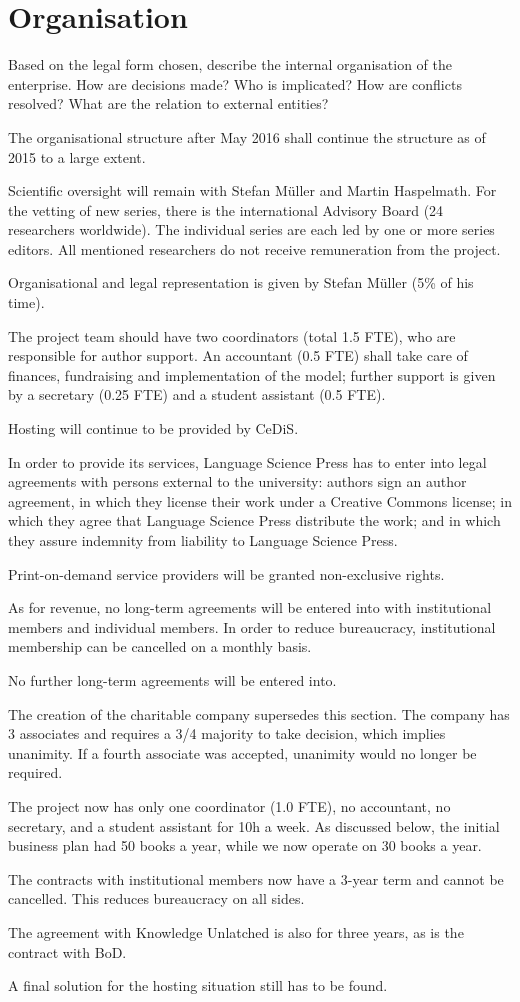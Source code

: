 \documentclass[nonflat,smallfont
]{langsci/langscibook}
\newcommand{\background}[1]{ 
  \vspace{5mm}
  \renewcommand{\tblslinecolour}{lsDarkBlue}
  \tblssy[red]{explore2}{Background}{\vspace*{-5mm}#1}
}
\newcommand{\langscisolution}[1]{
  \renewcommand{\tblslinecolour}{lsLightBlue}
  \tblssy{langsci}{LangSci solution}{\vspace*{-5mm}#1}
}
\newcommand{\evaluation}[1]{
  \renewcommand{\tblslinecolour}{lsLightOrange}
  \tblssy{receipt}{Evaluation}{\vspace*{-5mm}#1}
}
\renewcommand{\tblssy}[4][black!12]{%
  \renewcommand{\langscisymbol}{#2}\renewcommand{\tblsboxcolor}{#1}
  \begin{mdframed}[style=yellowexercise,frametitle={#3}]
    #4
  \end{mdframed}
}
\begin{document}
\section{Organisation}
\vspace*{5mm}
\background{Based on the legal form chosen, describe the internal organisation of the enterprise. How are decisions made? Who is implicated? How are conflicts resolved?
What are the relation to external entities?}
\langscisolution{

The organisational structure after May 2016 shall continue the structure as of 2015 to a large extent.

Scientific oversight will remain with Stefan Müller and Martin Haspelmath. For the vetting of new series, there is the international Advisory Board (24 researchers worldwide). The individual series are each led by one or more series editors. All mentioned researchers do not receive remuneration from the project. 

Organisational and legal representation is given by Stefan Müller (5\% of his time).

The project team should have two coordinators (total 1.5 FTE), who are responsible for author support. An accountant (0.5 FTE) shall take care of finances, fundraising and implementation of the model; further support is given by a secretary (0.25 FTE) and a student assistant (0.5 FTE). 

Hosting will continue to be provided by CeDiS.

In order to provide its services, Language Science Press has to enter into legal agreements with persons external to the university: authors sign an author agreement, in which they license their work under a Creative Commons license; in which they agree that Language Science Press distribute the work; and in which they assure indemnity from liability to Language Science Press.

Print-on-demand service providers will be granted non-ex\-clu\-sive rights. 

As for revenue, no long-term agreements will be entered into with institutional members and individual members. In order to reduce bureaucracy, institutional membership can be cancelled on a monthly basis. 

No further long-term agreements will be entered into. 
}
\evaluation{
The creation of the charitable company supersedes this section. The company has 3 associates and requires a 3/4 majority to take decision, which implies unanimity. If a fourth associate was accepted, unanimity would no longer be required.

The project now has only one coordinator (1.0 FTE), no accountant, no secretary, and a student assistant for 10h a week. As discussed below, the initial business plan had 50 books a year, while we now operate on 30 books a year.

The contracts with institutional members now have a 3-year term and cannot be cancelled. This reduces bureaucracy on all sides. 

The agreement with Knowledge Unlatched is also for three years, as is the contract with BoD.

A final solution for the hosting situation still has to be found.
}
\end{document}
